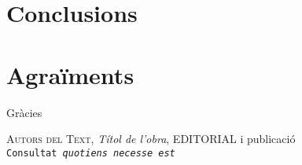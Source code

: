 \documentclass[a4paper,11pt, titlepage, twoside]{article}
\begin{document}
\section*{Conclusions}
 
\section*{Agraïments}
 Gràcies

 
 
 \begin{thebibliography}{99}\label{biblio}
 
  \textsc{Autors del Text}, {} 
 \textit{Títol de l'obra}, EDITORIAL i publicació\\ 
 \texttt{Consultat \emph{quotiens necesse est}}
 

 \end{thebibliography}
 
 
\end{document}
